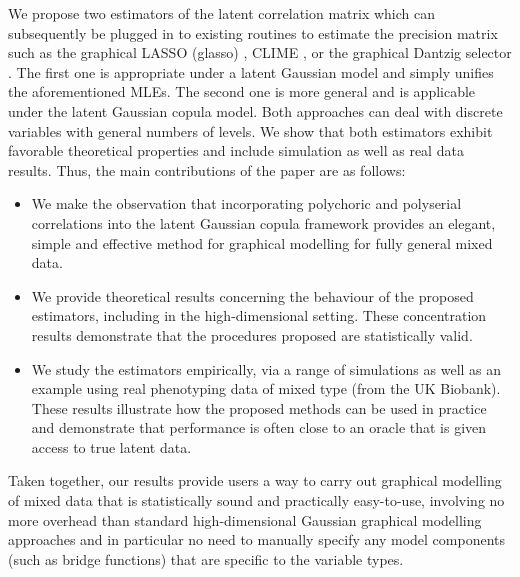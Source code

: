 We propose two estimators of the latent correlation matrix which can subsequently be plugged in to existing routines to estimate the precision matrix such as the graphical LASSO (glasso) \citep{Friedman08}, CLIME \citep{Cai11}, or the graphical Dantzig selector \citep{Yuan10}. The first one is appropriate under a latent Gaussian model and simply unifies the aforementioned MLEs. The second one is more general and is applicable under the latent Gaussian copula model. Both approaches can deal with discrete variables with general numbers of levels. 
We show that both estimators exhibit favorable theoretical properties and include simulation as well as real data results. Thus, the main contributions of the paper are as follows:
\begin{itemize}
\item We make the observation that incorporating polychoric and polyserial correlations into the latent Gaussian copula framework provides an elegant, simple and effective method for graphical modelling for fully general mixed data. 
\item We provide theoretical results concerning the behaviour of the proposed estimators, including in the high-dimensional setting. These concentration results demonstrate that the procedures proposed are statistically valid.
\item We study the estimators empirically, via a range of simulations as well as an  example using  real  phenotyping data of mixed type (from the UK Biobank). These results illustrate how the proposed methods can be used in practice and demonstrate that performance is often close to an oracle that is given access to true latent data.
\end{itemize}

Taken together, our results provide users a way to carry out graphical modelling of mixed data that is statistically sound and practically easy-to-use, involving no more overhead than standard high-dimensional Gaussian graphical modelling approaches and in particular no need to manually specify any model components (such as bridge functions) that are specific to the variable types. 


